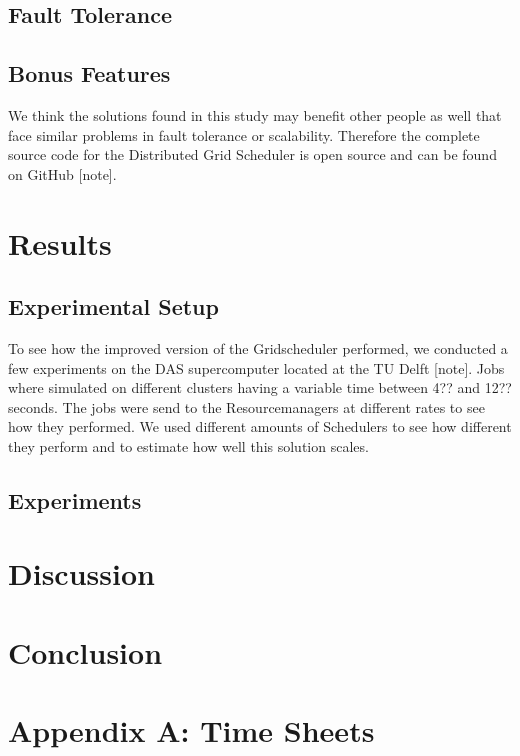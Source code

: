\documentclass[twocolumn,a4paper]{article}
\begin{document}
\subsection{Fault Tolerance}


\subsection{Bonus Features}
We think the solutions found in this study may benefit other people as well that face similar problems in fault tolerance or scalability. Therefore the complete source code for the Distributed Grid Scheduler is open source and can be found on GitHub [note].  

\section{Results}


\subsection{Experimental Setup}
To see how the improved version of the Gridscheduler performed, we conducted a few experiments on the DAS supercomputer located at the TU Delft [note]. Jobs where simulated on different clusters having a variable time between 4?? and 12?? seconds. The jobs were send to the Resourcemanagers at different rates to see how they performed. We used different amounts of Schedulers to see how different they perform and to estimate how well this solution scales. 

\subsection{Experiments}


\section{Discussion}

\section{Conclusion}

\section{Appendix A: Time Sheets}
\end{document}
